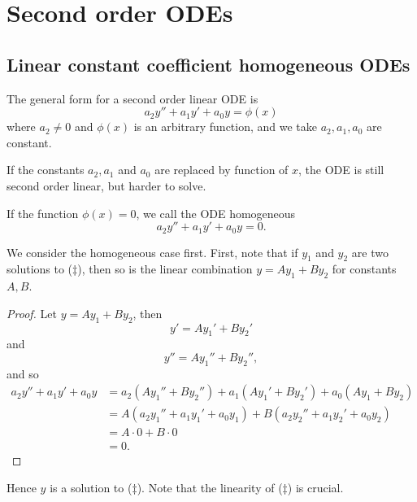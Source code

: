 \documentclass[10pt, a4paper]{article}
\begin{document}
\newpage

\section{Second order ODEs}

\subsection{Linear constant coefficient homogeneous ODEs}
The general form for a second order linear ODE is
\begin{equation}\tag{$\dagger$}
    a_2y'' + a_1y' + a_0y = \phi(x)
\end{equation}
where $a_2 \neq 0$ and $\phi(x)$ is an arbitrary function,
and we take $a_2, a_1, a_0$ are constant.

If the constants $a_2, a_1$ and $a_0$ are replaced by function of $x$,
the ODE is still second order linear,
but harder to solve.

If the function $\phi(x) = 0$,
we call the ODE homogeneous
\begin{equation}\tag{$\ddagger$}
    a_2y'' + a_1y' + a_0y = 0.
\end{equation}

We consider the homogeneous case first.
First,
note that if $y_1$ and $y_2$ are two solutions to ($\ddagger$),
then so is the linear combination $y = Ay_1 + By_2$ for constants $A, B$.
\begin{proof}
    Let $y = Ay_1 + By_2$,
    then
    \[
    y' = Ay_1' + By_2'
    \]
    and
    \[
    y'' = Ay_1'' + By_2'',
    \]
    and so
    \begin{align*}
        a_2y'' + a_1y' + a_0y &= a_2(Ay_1'' + By_2'') + a_1(Ay_1' + By_2') + a_0(Ay_1 + By_2) \\
        &= A(a_2y_1'' + a_1y_1' + a_0y_1) + B(a_2y_2'' + a_1y_2' + a_0y_2) \\
        &= A\cdot 0 + B\cdot 0 \\
        &= 0.
    \end{align*}
\end{proof}
Hence $y$ is a solution to ($\ddagger$).
Note that the linearity of ($\ddagger$) is crucial.
\end{document}

